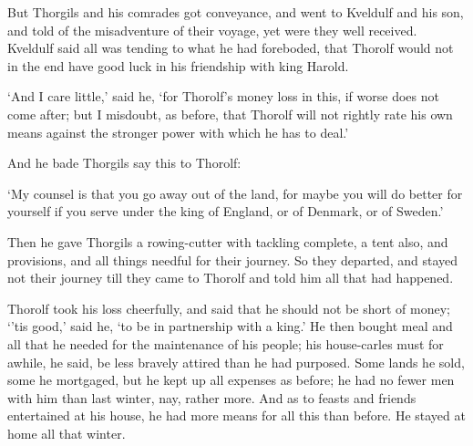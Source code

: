 But Thorgils and his comrades got conveyance, and went to Kveldulf and his son, and told of the misadventure of their voyage, yet were they well received. Kveldulf said all was tending to what he had foreboded, that Thorolf would not in the end have good luck in his friendship with king Harold.

`And I care little,' said he, `for Thorolf's money loss in this, if worse does not come after; but I misdoubt, as before, that Thorolf will not rightly rate his own means against the stronger power with which he has to deal.'

And he bade Thorgils say this to Thorolf:

`My counsel is that you go away out of the land, for maybe you will do better for yourself if you serve under the king of England, or of Denmark, or of Sweden.'

Then he gave Thorgils a rowing-cutter with tackling complete, a tent also, and provisions, and all things needful for their journey. So they departed, and stayed not their journey till they came to Thorolf and told him all that had happened.

Thorolf took his loss cheerfully, and said that he should not be short of money; `'tis good,' said he, `to be in partnership with a king.' He then bought meal and all that he needed for the maintenance of his people; his house-carles must for awhile, he said, be less bravely attired than he had purposed. Some lands he sold, some he mortgaged, but he kept up all expenses as before; he had no fewer men with him than last winter, nay, rather more. And as to feasts and friends entertained at his house, he had more means for all this than before. He stayed at home all that winter.
